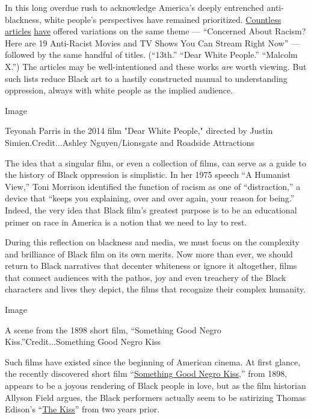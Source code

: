 In this long overdue rush to acknowledge America's deeply entrenched
anti-blackness, white people's perspectives have remained prioritized.
\href{https://www.esquire.com/entertainment/g32799997/black-movies-shows-on-netflix/}{Countless}
\href{https://www.vanityfair.com/hollywood/2020/06/the-help-netflix-watch-list}{articles}
\href{https://www.digitaltrends.com/movies/best-black-movies-on-netflix/}{have}
offered variations on the same theme --- ``Concerned About Racism? Here
are 19 Anti-Racist Movies and TV Shows You Can Stream Right Now'' ---
followed by the same handful of titles. (``13th.'' ``Dear White
People.'' ``Malcolm X.'') The articles may be well-intentioned and these
works \emph{are} worth viewing. But such lists reduce Black art to a
hastily constructed manual to understanding oppression, always with
white people as the implied audience.

Image

Teyonah Parris in the 2014 film "Dear White People," directed by Justin
Simien.Credit...Ashley Nguyen/Lionsgate and Roadside Attractions

The idea that a singular film, or even a collection of films, can serve
as a guide to the history of Black oppression is simplistic. In her 1975
speech ``A Humanist View,'' Toni Morrison identified the function of
racism as one of ``distraction,'' a device that ``keeps you explaining,
over and over again, your reason for being.'' Indeed, the very idea that
Black film's greatest purpose is to be an educational primer on race in
America is a notion that we need to lay to rest.

During this reflection on blackness and media, we must focus on the
complexity and brilliance of Black film on its own merits. Now more than
ever, we should return to Black narratives that decenter whiteness or
ignore it altogether, films that connect audiences with the pathos, joy
and even treachery of the Black characters and lives they depict, the
films that recognize their complex humanity.

Image

A scene from the 1898 short film, ``Something Good Negro
Kiss.''Credit...Something Good Negro Kiss

Such films have existed since the beginning of American cinema. At first
glance, the recently discovered short film
``\href{https://www.youtube.com/watch?v=LIKU5kncg8U}{Something Good
Negro Kiss,}'' from 1898, appears to be a joyous rendering of Black
people in love, but as the film historian Allyson Field argues, the
Black performers actually seem to be satirizing Thomas Edison's
``\href{https://www.youtube.com/watch?v=IUyTcpvTPu0}{The Kiss}'' from
two years prior.

